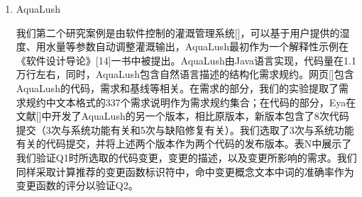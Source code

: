 \begin{enumerate}
  \item AquaLush

  我们第二个研究案例是由软件控制的灌溉管理系统[]，可以基于用户提供的湿度、用水量等参数自动调整灌溉输出，AquaLush最初作为一个解释性示例在《软件设计导论》[14]一书中被提出。AquaLush由Java语言实现，代码量在1.1万行左右，同时，AquaLush包含自然语言描述的结构化需求规约。网页[]包含AquaLush的代码，需求和基线等相关。在需求的部分，我们的实验提取了需求规约中文本格式的337个需求说明作为需求规约集合；在代码的部分，Eya在文献[]中开发了AquaLush的另一个版本，相比原版本，新版本包含了8次代码提交（3次与系统功能有关和5次与缺陷修复有关）。我们选取了3次与系统功能有关的代码提交，并将上述两个版本作为两个代码的发布版本。表N中展示了我们验证Q1时所选取的代码变更，变更的描述，以及变更所影响的需求。我们同样采取计算推荐的变更函数标识符中，命中变更概念文本中词的准确率作为变更函数的评分以验证Q2。


\end{enumerate}
